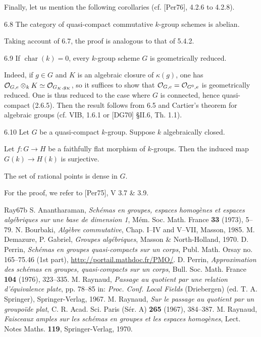 Finally, let us mention the following corollaries (cf. [Per76], 4.2.6 to 4.2.8).
\begin{corollary}{6.8}\label{VIA.6.8}
The category of quasi-compact commutative $k$-group schemes is abelian.
\end{corollary}
Taking account of 6.7, the proof is analogous to that of 5.4.2.
\begin{corollary}{6.9}\label{VIA.6.9}
If $\operatorname{char}(k)=0$, every $k$-group scheme $G$ is geometrically reduced.
\end{corollary}
Indeed, if $g\in G$ and $K$ is an algebraic closure of $\kappa(g)$, one has $\mathcal{O}_{G,e}\otimes_kK\simeq\mathcal{O}_{G_K,g_K}$, so it suffices to show that $\mathcal{O}_{G,e}=\mathcal{O}_{G^0,e}$ is geometrically reduced. One is thus reduced to the case where $G$ is connected, hence quasi-compact (2.6.5). Then the result follows from 6.5 and Cartier's theorem for algebraic groups (cf. VIB, 1.6.1 or [DG70] §II.6, Th. 1.1).
\begin{corollary}{6.10}\label{VIA.6.10}
Let $G$ be a quasi-compact $k$-group. Suppose $k$ algebraically closed.
\begin{enumeratei}
\item Let $f:G\to H$ be a faithfully flat morphism of $k$-groups. Then the induced map $G(k)\to H(k)$ is surjective.
\item The set of rational points is dense in $G$.
\end{enumeratei}
\end{corollary}
For the proof, we refer to [Per75], V 3.7 \& 3.9.

\begin{thebibliography}{Ray67b}
 S. Anantharaman, \emph{Schémas en groupes, espaces homogènes et espaces algébriques sur une base de dimension 1}, Mém. Soc. Math. France \textbf{33} (1973), 5--79.
 N. Bourbaki, \emph{Algèbre commutative}, Chap. I--IV and V--VII, Masson, 1985.
 M. Demazure, P. Gabriel, \emph{Groupes algébriques}, Masson \& North-Holland, 1970.
 D. Perrin, \emph{Schémas en groupes quasi-compacts sur un corps}, Publ. Math. Orsay no. 165--75.46 (1st part), \url{http://portail.mathdoc.fr/PMO/}.
 D. Perrin, \emph{Approximation des schémas en groupes, quasi-compacts sur un corps}, Bull. Soc. Math. France \textbf{104} (1976), 323--335.
 M. Raynaud, \emph{Passage au quotient par une relation d'équivalence plate}, pp. 78--85 in: \emph{Proc. Conf. Local Fields} (Driebergen) (ed. T. A. Springer), Springer-Verlag, 1967.
 M. Raynaud, \emph{Sur le passage au quotient par un groupoïde plat}, C. R. Acad. Sci. Paris (Sér. A) \textbf{265} (1967), 384--387.
 M. Raynaud, \emph{Faisceaux amples sur les schémas en groupes et les espaces homogènes}, Lect. Notes Maths. \textbf{119}, Springer-Verlag, 1970.
\end{thebibliography}
